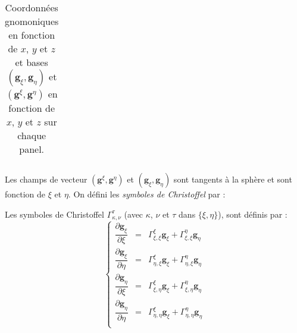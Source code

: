 \begin{table}[htbp]
\begin{center}
\begin{tabular}{|c|c|c|}
\end{tabular}
\end{center}
\caption{Coordonnées gnomoniques en fonction de $x$, $y$ et $z$ et bases $\left( \mathbf{g}_{\xi}, \mathbf{g}_{\eta} \right)$ et $\left( \mathbf{g}^{\xi}, \mathbf{g}^{\eta} \right)$ en fonction de $x$, $y$ et $z$  sur chaque panel.}
\label{tab: base g_xi g_eta}
\end{table}












Les champs de vecteur $( \mathbf{g}^{\xi}, \mathbf{g}^{\eta})$ et $( \mathbf{g}_ {\xi}, \mathbf{g}_{\eta})$ sont tangents à la sphère et sont fonction de $\xi$ et $\eta$. On défini les \textit{symboles de Christoffel} par :

\begin{definition}
Les symboles de Christoffel $\Gamma_{\kappa,\nu}^{\tau}$ (avec $\kappa$, $\nu$ et $\tau$ dans $\lbrace \xi, \eta \rbrace$), sont définis par :
\begin{equation}
\left\lbrace
\begin{array}{rcl}
\dfrac{\partial \mathbf{g}_{\xi}}{\partial \xi} & = & \Gamma_{\xi,\xi}^{\xi} \mathbf{g}_{\xi} + \Gamma_{\xi,\xi}^{\eta} \mathbf{g}_{\eta}\\

\dfrac{\partial \mathbf{g}_{\xi}}{\partial \eta} & = & \Gamma_{\eta,\xi}^{\xi} \mathbf{g}_{\xi} + \Gamma_{\eta,\xi}^{\eta} \mathbf{g}_{\eta}\\

\dfrac{\partial \mathbf{g}_{\eta}}{\partial \xi} & = & \Gamma_{\xi,\eta}^{\xi} \mathbf{g}_{\xi} + \Gamma_{\xi,\eta}^{\eta} \mathbf{g}_{\eta}\\

\dfrac{\partial \mathbf{g}_{\eta}}{\partial \eta} & = & \Gamma_{\eta,\eta}^{\xi} \mathbf{g}_{\xi} + \Gamma_{\eta,\eta}^{\eta} \mathbf{g}_{\eta}\\
\end{array}
\right.
\end{equation}

\end{definition}

